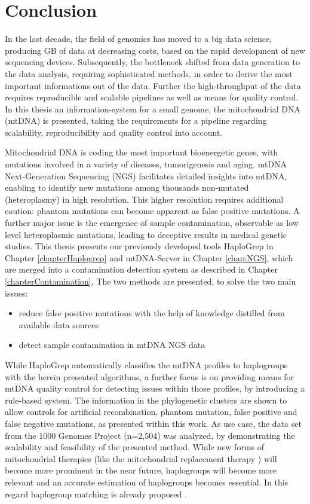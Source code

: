 \chapter{Conclusion}
\label{chap:conclusion}

In the last decade, the  field of genomics has moved to a big data science, producing GB of data at decreasing costs, based on the rapid development of new sequencing devices. Subsequently, the bottleneck shifted from data generation to the data analysis, requiring sophisticated methods, in order to derive the most important informations out of the data. Further the high-throughput of the data requires reproducible and scalable pipelines as well as means for quality control. In this thesis an information-system for a small genome, the mitochondrial DNA (mtDNA) is presented, taking the requirements for a pipeline regarding scalability, reproducibility and quality control into account. 

Mitochondrial DNA is coding the most important bioenergetic genes, with mutations involved in a variety of diseases, tumorigenesis and aging. mtDNA Next-Generation Sequencing (NGS) facilitates detailed insights into mtDNA, enabling to identify new mutations among thousands non-mutated (heteroplasmy) in high resolution. This higher resolution requires additional caution: phantom mutations can become apparent as false positive mutations. A further major issue is the emergence of sample contamination, observable as low level heteroplasmic mutations, leading to deceptive results in medical genetic studies.
This thesis presents our previously developed tools HaploGrep in Chapter \ref{chapterHaplogrep} and mtDNA-Server in Chapter \ref{chap:NGS}, which are merged into a contamination detection system as described in Chapter \ref{chapterContamination}. The two methods are presented, to solve the two main issues:
\begin{itemize}
\item reduce false positive mutations with the help of knowledge distilled from available data sources  
\item detect sample contamination in mtDNA NGS data
\end{itemize}
While HaploGrep automatically classifies the mtDNA profiles to haplogroups with the herein presented algorithms, a further focus is on providing means for mtDNA quality control for detecting issues within those profiles, by introducing a rule-based system. The information in the phylogenetic clusters are shown to allow controls for artificial recombination, phantom mutation, false positive and false negative mutations, as presented within this work. As use case, the data set from the 1000 Genomes Project (n=2,504) was analyzed, by demonstrating the scalability and feasibility of the presented method. While new forms of mitochondrial therapies (like the mitochondrial replacement therapy \cite{Falk2016}) will become more prominent in the near future, haplogroups will become more relevant and an accurate estimation of haplogroups becomes essential. In this regard haplogroup matching is already proposed \cite{Royrvik2016}.

